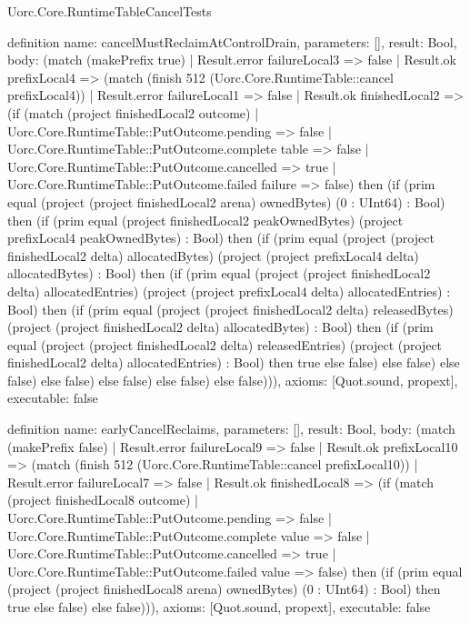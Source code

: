 \begin{lexlean}{Uorc.Core.RuntimeTableCancelTests}
\begin{semanticmodule}
definition{
  name: cancelMustReclaimAtControlDrain,
  parameters: [],
  result: Bool,
  body: (match (makePrefix true)
    | Result.error failureLocal3 => false
    | Result.ok prefixLocal4 => (match (finish 512 (Uorc.Core.RuntimeTable::cancel prefixLocal4))
      | Result.error failureLocal1 => false
      | Result.ok finishedLocal2 => (if (match (project finishedLocal2 outcome)
        | Uorc.Core.RuntimeTable::PutOutcome.pending => false
        | Uorc.Core.RuntimeTable::PutOutcome.complete table => false
        | Uorc.Core.RuntimeTable::PutOutcome.cancelled => true
        | Uorc.Core.RuntimeTable::PutOutcome.failed failure => false) then (if (prim equal (project (project finishedLocal2 arena) ownedBytes) (0 : UInt64) : Bool) then (if (prim equal (project finishedLocal2 peakOwnedBytes) (project prefixLocal4 peakOwnedBytes) : Bool) then (if (prim equal (project (project finishedLocal2 delta) allocatedBytes) (project (project prefixLocal4 delta) allocatedBytes) : Bool) then (if (prim equal (project (project finishedLocal2 delta) allocatedEntries) (project (project prefixLocal4 delta) allocatedEntries) : Bool) then (if (prim equal (project (project finishedLocal2 delta) releasedBytes) (project (project finishedLocal2 delta) allocatedBytes) : Bool) then (if (prim equal (project (project finishedLocal2 delta) releasedEntries) (project (project finishedLocal2 delta) allocatedEntries) : Bool) then true else false) else false) else false) else false) else false) else false) else false))),
  axioms: [Quot.sound, propext],
  executable: false
}

definition{
  name: earlyCancelReclaims,
  parameters: [],
  result: Bool,
  body: (match (makePrefix false)
    | Result.error failureLocal9 => false
    | Result.ok prefixLocal10 => (match (finish 512 (Uorc.Core.RuntimeTable::cancel prefixLocal10))
      | Result.error failureLocal7 => false
      | Result.ok finishedLocal8 => (if (match (project finishedLocal8 outcome)
        | Uorc.Core.RuntimeTable::PutOutcome.pending => false
        | Uorc.Core.RuntimeTable::PutOutcome.complete value => false
        | Uorc.Core.RuntimeTable::PutOutcome.cancelled => true
        | Uorc.Core.RuntimeTable::PutOutcome.failed value => false) then (if (prim equal (project (project finishedLocal8 arena) ownedBytes) (0 : UInt64) : Bool) then true else false) else false))),
  axioms: [Quot.sound, propext],
  executable: false
}


\end{semanticmodule}
\end{lexlean}
